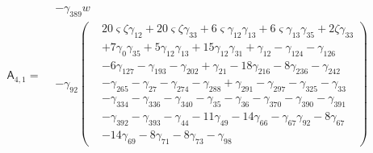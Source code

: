 \[\mathsf A_{4,1}=\begin{aligned}&- \gamma_{389} w\\&- \gamma_{92} \left(\begin{aligned}& 20 \varsigma  \zeta  \gamma_{12}+ 20 \varsigma  \zeta  \gamma_{33}+ 6 \varsigma  \gamma_{12} \gamma_{13}+ 6 \varsigma  \gamma_{13} \gamma_{35}+ 2 \zeta  \gamma_{33}\\&+ 7 \gamma_{0} \gamma_{35}+ 5 \gamma_{12} \gamma_{13}+ 15 \gamma_{12} \gamma_{31}+ \gamma_{12}- \gamma_{124}- \gamma_{126}\\&- 6 \gamma_{127}- \gamma_{193}- \gamma_{202}+ \gamma_{21}- 18 \gamma_{216}- 8 \gamma_{236}- \gamma_{242}\\&- \gamma_{265}- \gamma_{27}- \gamma_{274}- \gamma_{288}+ \gamma_{291}- \gamma_{297}- \gamma_{325}- \gamma_{33}\\&- \gamma_{334}- \gamma_{336}- \gamma_{340}- \gamma_{35}- \gamma_{36}- \gamma_{370}- \gamma_{390}- \gamma_{391}\\&- \gamma_{392}- \gamma_{393}- \gamma_{44}- 11 \gamma_{49}- 14 \gamma_{66}- \gamma_{67} \gamma_{92}- 8 \gamma_{67}\\&- 14 \gamma_{69}- 8 \gamma_{71}- 8 \gamma_{73}- \gamma_{98}\end{aligned}\right)\end{aligned}\]

